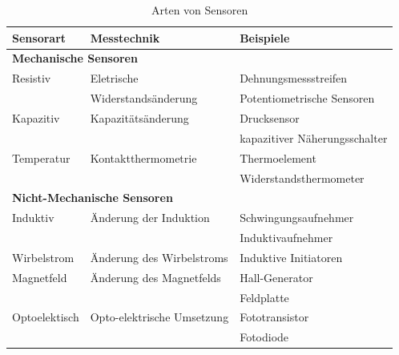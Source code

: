         \begin{table}
        \begin{tabularx}{\textwidth}{l|l|l}

                    \textbf{Sensorart} & \textbf{Messtechnik} & \textbf{Beispiele}\\
					\hline
                    \multicolumn{3}{l}{\textbf{Mechanische Sensoren}}\\
                    \hline
					Resistiv & Eletrische & Dehnungsmessstreifen \\
					&Widerstandsänderung& Potentiometrische Sensoren\\
					\hline
                    
                    Kapazitiv & Kapazitätsänderung & Drucksensor\\
                    && kapazitiver Näherungsschalter \\
					\hline
					
					Temperatur & Kontaktthermometrie & Thermoelement\\
					&& Widerstandsthermometer \\
                    \hline

                    \multicolumn{3}{l}{\textbf{Nicht-Mechanische Sensoren}}\\
                    \hline

                    Induktiv & Änderung der Induktion & Schwingungsaufnehmer \\
                    && Induktivaufnehmer\\
                    \hline
								
                    Wirbelstrom & Änderung des Wirbelstroms & Induktive Initiatoren\\
                    \hline
                    
                    Magnetfeld & Änderung des Magnetfelds & Hall-Generator\\
                    && Feldplatte\\
                    \hline

                    Optoelektisch & Opto-elektrische Umsetzung & Fototransistor\\
                    && Fotodiode\\
                    

                \end{tabularx}\\
                \caption{Arten von Sensoren}
                \label{fig:TS09}
            \end{table}

